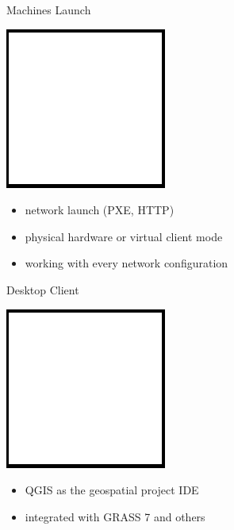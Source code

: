 \documentclass[12pt]{beamer}
\begin{document}
\begin{frame}{Machines Launch}
	\begin{center}
		\includegraphics[keepaspectratio=true,height=0.5\textheight]{images/image.png}
	\end{center}
	\begin{itemize}
		\item network launch (PXE, HTTP)
		\item physical hardware or virtual client mode
		\item working with every network configuration
	\end{itemize}
\end{frame}

\begin{frame}{Desktop Client}
	\begin{center}
		\includegraphics[keepaspectratio=true,height=0.5\textheight]{images/image.png}
	\end{center}
	\begin{itemize}
		\item QGIS as the geospatial project IDE
		\item integrated with GRASS 7 and others
	\end{itemize}
\end{frame}
\end{document}

